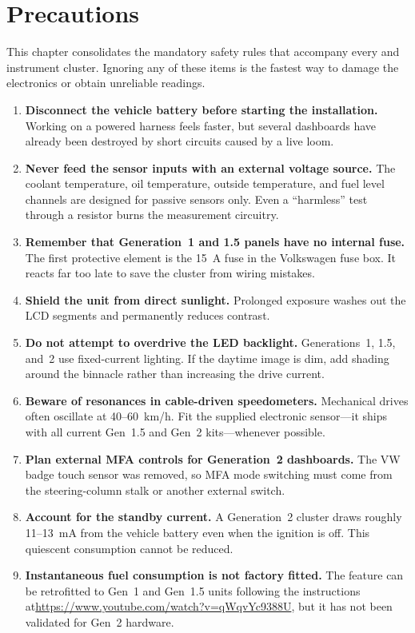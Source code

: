 \chapter{Precautions}\label{ch:precautions}

This chapter consolidates the mandatory safety rules that accompany every \ReplicaGenOne{} and \ReplicaNextLong{} instrument cluster. Ignoring any of these items is the fastest way to damage the electronics or obtain unreliable readings.

\begin{enumerate}
    \item \textbf{Disconnect the vehicle battery before starting the installation.} Working on a powered harness feels faster, but several dashboards have already been destroyed by short circuits caused by a live loom.
    \item \textbf{Never feed the sensor inputs with an external voltage source.} The coolant temperature, oil temperature, outside temperature, and fuel level channels are designed for passive sensors only. Even a “harmless” test through a resistor burns the measurement circuitry.
    \item \textbf{Remember that Generation~1 and 1.5 panels have no internal fuse.} The first protective element is the 15~A fuse in the Volkswagen fuse box. It reacts far too late to save the cluster from wiring mistakes.
    \item \textbf{Shield the unit from direct sunlight.} Prolonged exposure washes out the LCD segments and permanently reduces contrast.
    \item \textbf{Do not attempt to overdrive the LED backlight.} Generations~1, 1.5, and~2 use fixed-current lighting. If the daytime image is dim, add shading around the binnacle rather than increasing the drive current.
    \item \textbf{Beware of resonances in cable-driven speedometers.} Mechanical drives often oscillate at 40--60~km/h. Fit the supplied electronic sensor---it ships with all current Gen~1.5 and Gen~2 kits---whenever possible.
    \item \textbf{Plan external MFA controls for Generation~2 dashboards.} The VW badge touch sensor was removed, so MFA mode switching must come from the steering-column stalk or another external switch.
    \item \textbf{Account for the standby current.} A Generation~2 cluster draws roughly 11--13~mA from the vehicle battery even when the ignition is off. This quiescent consumption cannot be reduced.
    \item \textbf{Instantaneous fuel consumption is not factory fitted.} The feature can be retrofitted to Gen~1 and Gen~1.5 units following the instructions at\newline\url{https://www.youtube.com/watch?v=qWqvYc9388U}, but it has not been validated for Gen~2 hardware.
\end{enumerate}

